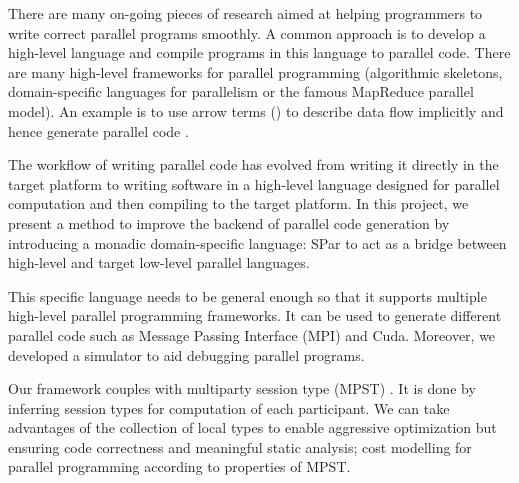 There are many on-going pieces of research aimed at helping programmers to write correct parallel programs smoothly. A common approach is to develop a high-level language and compile programs in this language to parallel code. There are many high-level frameworks for parallel programming (\eg algorithmic skeletons\cite{coleAlgorithmicSkeletonsStructured}, domain-specific languages for parallelism\cite{brownHeterogeneousParallelFramework2011} or the famous MapReduce parallel model\cite{liMapReduceParallelProgramming2016}). An example is to use arrow terms () to describe data flow implicitly and hence generate parallel code \cite{braunArrowsParallelComputation2018}.

The workflow of writing parallel code has evolved from writing it directly in the target platform to writing software in a high-level language designed for parallel computation and then compiling to the target platform. In this project, we present a method to improve the backend of parallel code generation by introducing a monadic domain-specific language: SPar to act as a bridge between high-level and target low-level parallel languages.

This specific language needs to be general enough so that it supports multiple high-level parallel programming frameworks. It can be used to generate different parallel code such as Message Passing Interface (MPI) and Cuda. Moreover, we developed a simulator to aid debugging parallel programs.


Our framework couples with multiparty session type (MPST) \cite{coppoGentleIntroductionMultiparty2015}. It is done by inferring session types for computation of each participant. We can take advantages of the collection of local types to enable aggressive optimization but ensuring code correctness and meaningful static analysis; \eg cost modelling for parallel programming according to properties of MPST.
